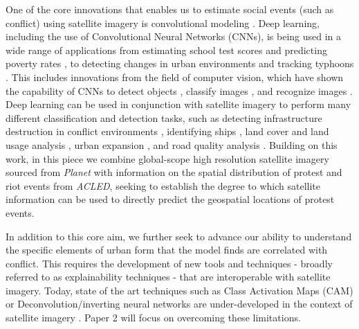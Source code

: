 One of the core innovations that enables us to estimate social events (such as conflict) using satellite imagery is convolutional modeling \citep{goodman2021convolutional}. 
Deep learning, including the use of Convolutional Neural Networks (CNNs), is being used in a wide range of applications from estimating school test scores \citep{runfola2022using} and predicting poverty rates \citep{jean2016combining}, to detecting changes in urban environments \citep{daudt2018urban} and tracking typhoons \citep{ruttgers2019prediction}.  This includes innovations from the field of computer vision, which have shown the capability of CNNs to detect objects \citep{shin2016deep},  classify images \citep{krizhevsky2017imagenet}, and recognize images \citep{chauhan2018convolutional}.  Deep learning can be used in conjunction with satellite imagery to perform many different classification and detection tasks, such as detecting infrastructure destruction in conflict environments \citep{nabiee2022hybrid}, identifying ships \citep{leclerc2018ship,patel2022deep}, land cover and land usage analysis \citep{helber2019eurosat, kussul2017deep, carranza2019framework, lv2024mapping}, urban expansion \citep{zhang2018urban, he2019detecting, zhang2019detecting}, and road quality analysis \citep{brewer2021predicting}.  Building on this work, in this piece we combine global-scope high resolution satellite imagery sourced from \textit{Planet} with information on the spatial distribution of protest and riot events from \textit{ACLED}, seeking to establish the degree to which satellite information can be used to directly predict the geospatial locations of protest events. 

In addition to this core aim, we further seek to advance our ability to understand the specific elements of urban form that the model finds are correlated with conflict.  This requires the development of new tools and techniques - broadly referred to as explainability techniques \citep{buhrmester2021analysis} - that are interoperable with satellite imagery.  Today, state of the art techniques such as Class Activation Maps (CAM) \citep{zhou2016learning} or  Deconvolution/inverting neural networks \citep{noh2015learning} are under-developed in the context of satellite imagery \citep{vasu2018aerial,charuchinda2019use,fu2019multicam}.  Paper 2 will focus on overcoming these limitations.

